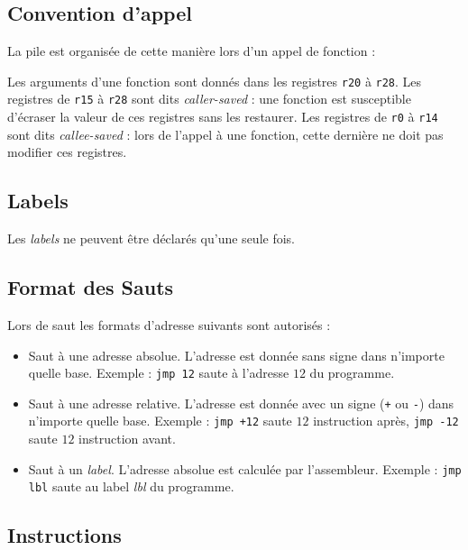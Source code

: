\documentclass[french, 12pt]{article}
\begin{document}
\subsection*{Convention d'appel}

La pile est organisée de cette manière lors d'un appel de fonction :


Les arguments d'une fonction sont donnés dans les registres \texttt{r20} à \texttt{r28}.
Les registres de \texttt{r15} à \texttt{r28} sont dits \emph{caller-saved} :
une fonction est susceptible d'écraser la valeur de ces registres sans les restaurer.
Les registres de \texttt{r0} à \texttt{r14} sont dits \emph{callee-saved} :
lors de l'appel à une fonction, cette dernière ne doit pas modifier ces registres.

\subsection*{Labels}

Les \emph{labels} ne peuvent être déclarés qu'une seule fois.

\subsection*{Format des Sauts}

Lors de saut les formats d'adresse suivants sont autorisés :
\begin{itemize}
      \item Saut à une adresse absolue. L'adresse est donnée sans signe dans
            n'importe quelle base. Exemple : \verb|jmp 12| saute à l'adresse $12$ du programme.
      \item Saut à une adresse relative. L'adresse est donnée avec un signe
            (\texttt{+} ou \texttt{-}) dans n'importe quelle base. Exemple :
            \verb|jmp +12| saute $12$ instruction après, \verb|jmp -12| saute
            $12$ instruction avant.
      \item Saut à un \emph{label}. L'adresse absolue est calculée par
            l'assembleur. Exemple : \verb|jmp lbl| saute au label \emph{lbl} du
            programme.
\end{itemize}

\subsection*{Instructions}

\renewcommand\tabularxcolumn[1]{m{#1}}
\renewcommand{\arraystretch}{1.5}
\end{document}
